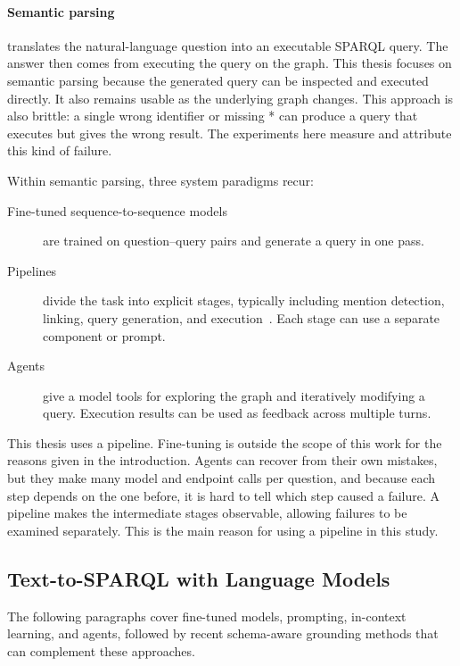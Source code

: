 \paragraph{Semantic parsing} translates the natural-language question into an executable SPARQL
query.
The answer then comes from executing the query on the graph.
This thesis focuses on semantic parsing because the generated query can be inspected and executed directly. It also remains usable as the underlying graph changes.
This approach is also brittle: a single wrong identifier or missing * can produce a query that executes but gives the wrong result.
The experiments here measure and attribute this kind of failure.

Within semantic parsing, three system paradigms recur:

\begin{description}
\item[Fine-tuned sequence-to-sequence models]
are trained on question--query pairs and generate a query in one pass.
\item[Pipelines]
divide the task into explicit stages, typically including mention detection, linking, query generation, and execution~\citep{banerjee2024diss}.
Each stage can use a separate component or prompt.
\item[Agents]
give a model tools for exploring the graph and iteratively modifying a query.
Execution results can be used as feedback across multiple turns.
\end{description}

This thesis uses a pipeline.
Fine-tuning is outside the scope of this work for the reasons given in the introduction.
Agents can recover from their own mistakes, but they make many model and endpoint calls per question, and because each step depends on the one before, it is hard to tell which step caused a failure.
A pipeline makes the intermediate stages observable, allowing failures to be examined separately. This is the main reason for using a pipeline in this study.

\subsection{Text-to-SPARQL with Language
Models}

\label{sec:related-t2s}

The following paragraphs cover fine-tuned models, prompting, in-context learning, and agents, followed by recent schema-aware grounding methods that can complement these approaches.

